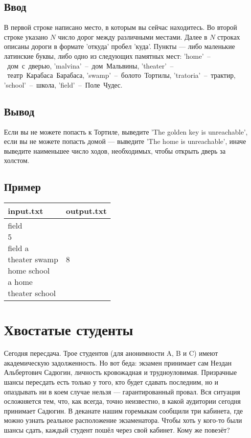 \documentclass[12pt, oneside]{article}
\begin{document}
\subsection*{Ввод}

В первой строке написано место, в которым вы сейчас находитесь.
Во второй строке указано $ N $ число дорог между различными местами. Далее в $ N $ строках описаны
дороги в формате 'откуда' пробел 'куда'. Пункты --- либо маленькие латинские буквы, либо одно из следующих
памятных мест: 'home'~--~дом~с~дверью, 'malvina'~--~дом~Мальвины, 'theater'~--~театр~Карабаса~Барабаса, 
'swamp'~--~болото~Тортилы, 'tratoria'~--~трактир, 'school'~--~школа, 'field'~--~Поле~Чудес.

\subsection*{Вывод}

Если вы не можете попасть к Тортиле, выведите 'The golden key is unreachable', если вы не можете попасть домой --- 
выведите 'The home is unreachable', иначе выведите наименьшее число ходов, необходимых, чтобы открыть дверь за холстом.

\subsection*{Пример}

\begin{tabular}{|p{}|p{}|}
\hline
input.txt &output.txt \\\hline
\makecell[tl]{field\\5\\field a\\theater swamp\\home school\\a home\\theater school}
&8\\\hline
\end{tabular}

\section{Хвостатые студенты}

Сегодня пересдача. Трое студентов (для анонимности A, B и C) имеют академическую задолженность. Но вот беда:
экзамен принимает сам Нездан Альбертович Садюгин, личность кровожадная и трудноуловимая. Призрачные шансы пересдать
есть только у того, кто будет сдавать последним, но и опаздывать ни в коем случае нельзя --- гарантированный провал.
Вся ситуация осложняется тем, что, как всегда, точно неизвестно, в какой аудитории сегодня принимает Садюгин. В деканате 
нашим горемыкам сообщили три кабинета, где можно узнать реальное расположение экзаменатора. Чтобы хоть у кого-то 
были шансы сдать, каждый студент пошёл через свой кабинет. Кому же повезёт?
\end{document}
